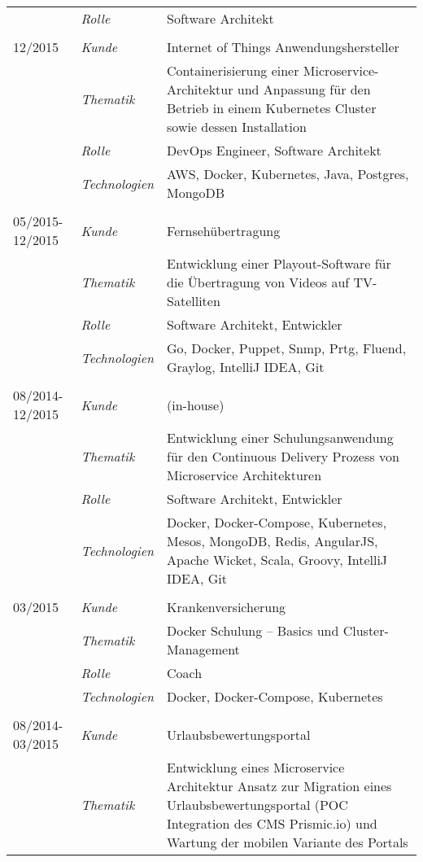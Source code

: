 \begin{longtable}{@{}>{}p{4cm}>{\itshape}p{2cm}>{}p{9cm}}
\nopagebreak		& Rolle 	    & Software Architekt\\
\\
12/2015             & Kunde 	    & Internet of Things Anwendungshersteller\\
\nopagebreak		& Thematik	    & Containerisierung einer Microservice-Architektur und Anpassung für den Betrieb in einem Kubernetes Cluster sowie dessen Installation\\
\nopagebreak		& Rolle 	    & DevOps Engineer, Software Architekt\\
\nopagebreak		& Technologien	& AWS, Docker, Kubernetes, Java, Postgres, MongoDB\\
\\
05/2015-12/2015     & Kunde 	    & Fernsehübertragung\\
\nopagebreak		& Thematik	    & Entwicklung einer Playout-Software für die Übertragung von Videos auf TV-Satelliten\\
\nopagebreak		& Rolle 	    & Software Architekt, Entwickler\\
\nopagebreak		& Technologien	& Go, Docker, Puppet, Snmp, Prtg, Fluend, Graylog, IntelliJ IDEA, Git\\
\\
08/2014-12/2015     & Kunde 	    & (in-house)\\
\nopagebreak		& Thematik	    & Entwicklung einer Schulungsanwendung für den Continuous Delivery Prozess von Microservice Architekturen\\
\nopagebreak		& Rolle 	    & Software Architekt, Entwickler\\
\nopagebreak		& Technologien	& Docker, Docker-Compose, Kubernetes, Mesos, MongoDB, Redis, AngularJS, Apache Wicket, Scala, Groovy, IntelliJ IDEA, Git\\
\\
03/2015             & Kunde 	    & Krankenversicherung\\
\nopagebreak		& Thematik	    & Docker Schulung – Basics und Cluster-Management\\
\nopagebreak		& Rolle 	    & Coach\\
\nopagebreak		& Technologien	& Docker, Docker-Compose, Kubernetes\\
\\
08/2014-03/2015     & Kunde 	    & Urlaubsbewertungsportal\\
\nopagebreak		& Thematik	    & Entwicklung eines Microservice Architektur Ansatz zur Migration eines Urlaubsbewertungsportal (POC Integration des CMS Prismic.io) und Wartung der mobilen Variante des Portals\\

\end{longtable}
